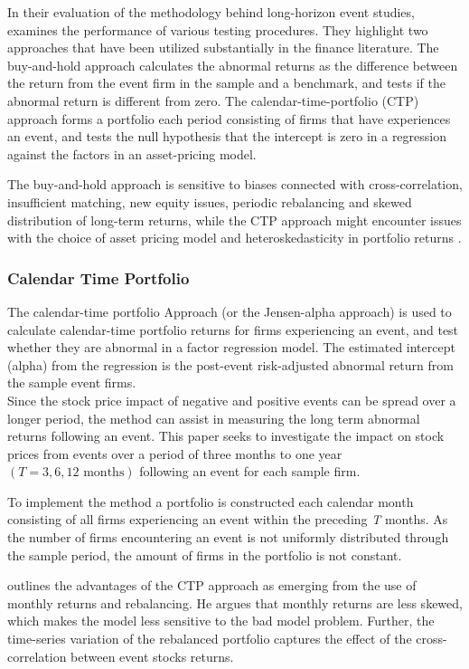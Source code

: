 In their evaluation of the methodology behind long-horizon event studies, \cite{Ang_event_method} examines the performance of various testing procedures. They highlight two approaches that have been utilized substantially in the finance literature. The buy-and-hold approach calculates the abnormal returns as the difference between the return from the event firm in the sample and a benchmark, and tests if the abnormal return is different from zero. The calendar-time-portfolio (CTP) approach forms a portfolio each period consisting of firms that have experiences an event, and tests the null hypothesis that the intercept is zero in a regression against the factors in an asset-pricing model.

The buy-and-hold approach is sensitive to biases connected with cross-correlation, insufficient matching, new equity issues, periodic rebalancing and skewed distribution of long-term returns, while the CTP approach might encounter issues with the choice of asset pricing model and heteroskedasticity in portfolio returns \citep{Ang_event_method}.  


\subsubsection{Calendar Time Portfolio}

The calendar-time portfolio Approach (or the Jensen-alpha approach) is used to calculate calendar-time portfolio returns for firms experiencing an event, and test whether they are abnormal in a factor regression model. The estimated intercept (alpha) from the regression is the post-event risk-adjusted abnormal return from the sample event firms. \\
Since the stock price impact of negative and positive events can be spread over a longer period, the method can assist in measuring the long term abnormal returns following an event. This paper seeks to investigate the impact on stock prices from events over a period of three months to one year $(T = 3, 6, 12 \text{ months})$ following an event for each sample firm. 

To implement the method a portfolio is constructed each calendar month consisting of all firms experiencing an event within the preceding \textit{T} months. As the number of firms encountering an event is not uniformly distributed through the sample period, the amount of firms in the portfolio is not constant. 

\cite{fama1998_events} outlines the advantages of the CTP approach as emerging from the use of monthly returns and rebalancing. He argues that monthly returns are less skewed, which makes the model less sensitive to the bad model problem. Further, the time-series variation of the rebalanced portfolio captures the effect of the cross-correlation between event stocks returns. 

